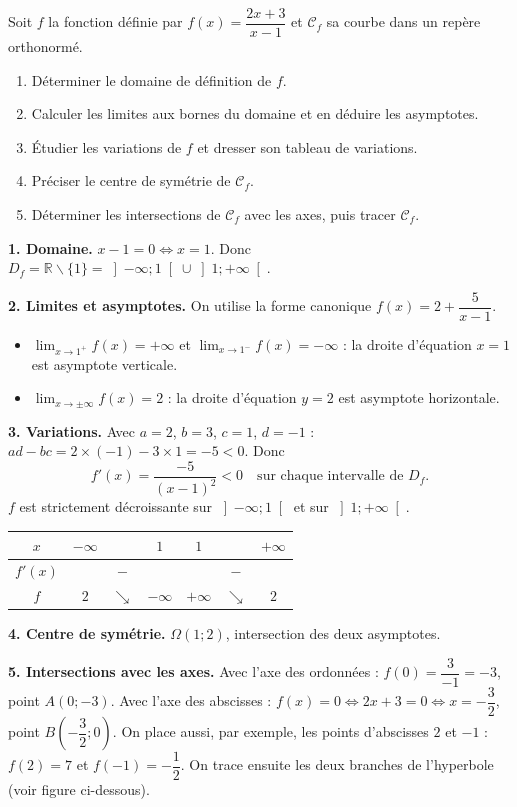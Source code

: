 \documentclass[11pt]{article}
\def\setminus{\mathbin{\backslash}}\let\smallsetminus\setminus
\begin{document}
\begin{exoresolu}[Étude complète de $f(x) = \dfrac{2x+3}{x-1}$]
Soit $f$ la fonction définie par $f(x) = \dfrac{2x+3}{x-1}$ et $\mathcal{C}_f$ sa courbe dans un repère orthonormé.
\begin{enumerate}
\item Déterminer le domaine de définition de $f$.
\item Calculer les limites aux bornes du domaine et en déduire les asymptotes.
\item Étudier les variations de $f$ et dresser son tableau de variations.
\item Préciser le centre de symétrie de $\mathcal{C}_f$.
\item Déterminer les intersections de $\mathcal{C}_f$ avec les axes, puis tracer $\mathcal{C}_f$.
\end{enumerate}
\tcblower
\textbf{1. Domaine.} $x - 1 = 0 \iff x = 1$. Donc $D_f = \mathbb{R} \setminus \{1\} = \left]-\infty ; 1\right[ \cup \left]1 ; +\infty\right[$.

\textbf{2. Limites et asymptotes.} On utilise la forme canonique $f(x) = 2 + \dfrac{5}{x-1}$.
\begin{itemize}
\item $\displaystyle\lim_{x \to 1^+} f(x) = +\infty$ et $\displaystyle\lim_{x \to 1^-} f(x) = -\infty$ : la droite d'équation $x = 1$ est asymptote verticale.
\item $\displaystyle\lim_{x \to \pm\infty} f(x) = 2$ : la droite d'équation $y = 2$ est asymptote horizontale.
\end{itemize}

\textbf{3. Variations.} Avec $a = 2$, $b = 3$, $c = 1$, $d = -1$ : $ad - bc = 2\times(-1) - 3\times 1 = -5 < 0$. Donc
\[ f'(x) = \frac{-5}{(x-1)^2} < 0 \quad \text{sur chaque intervalle de } D_f. \]
$f$ est strictement décroissante sur $\left]-\infty ; 1\right[$ et sur $\left]1 ; +\infty\right[$.

\begin{center}
\begin{tabular}{|c|ccc||ccc|}\hline
$x$ & $-\infty$ & & $1$ & $1$ & & $+\infty$ \\ \hline
$f'(x)$ & & $-$ & & & $-$ & \\ \hline
$f$ & $2$ & $\searrow$ & $-\infty$ & $+\infty$ & $\searrow$ & $2$ \\ \hline
\end{tabular}
\end{center}

\textbf{4. Centre de symétrie.} $\Omega\left(1 ; 2\right)$, intersection des deux asymptotes.

\textbf{5. Intersections avec les axes.} Avec l'axe des ordonnées : $f(0) = \dfrac{3}{-1} = -3$, point $A(0 ; -3)$. Avec l'axe des abscisses : $f(x) = 0 \iff 2x + 3 = 0 \iff x = -\dfrac{3}{2}$, point $B\left(-\dfrac{3}{2} ; 0\right)$. On place aussi, par exemple, les points d'abscisses $2$ et $-1$ : $f(2) = 7$ et $f(-1) = -\dfrac{1}{2}$. On trace ensuite les deux branches de l'hyperbole (voir figure ci-dessous).
\end{exoresolu}
\end{document}
